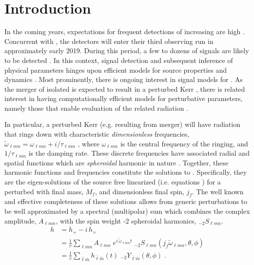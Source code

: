 \documentclass[twocolumn,aps,prd,floatfix,preprintnumbers,a4paper,nofootinbib,
superscriptaddress,10pt]{revtex4-1}
\newcommand{\cw}{\tilde{\omega}}
\def\jf{j_f}
\def\mf{M_f}
\def\lmn{_{\ell m n}}
\def\LM{_{\bar{\ell} \bar{m}}}
\begin{document}
\section{Introduction}
%
In the coming years, expectations for frequent \gw{} detections of increasing \snr{} are high \cite{TheLIGOScientific:2016pea,Abbott:2016nhf}.
%
Concurrent with \virgo{}, the \aligo{} detectors will enter their third observing run in approximately early 2019.
%
During this period, a few to dozens of \bbh{} signals are likely to be detected \cite{Abbott:2016nhf}.
%
In this context, signal detection and subsequent inference of physical parameters hinges upon efficient models for source properties and dynamics \cite{Abbott:2016wiq}.
%
Most prominently, there is ongoing interest in signal models for \bbh{} \imr{} \cite{Blackman:2017dfb, London:2017bcn, Hannam:2013oca}.
%
As the merger of isolated  is expected to result in a perturbed Kerr \bh{}, there is related interest in having computationally efficient models for perturbative parameters, namely those that enable evaluation of the related \rd{} radiation \cite{Berti:2005ys}.
%
\par In particular, a perturbed Kerr \bh{} (e.g. resulting from \bbh{} merger) will have \gw{} radiation that rings down with characteristic \textit{dimensionless} frequencies,
%
$%
	\cw\lmn = \omega\lmn + i/\tau\lmn
$%
, where $\omega\lmn$ is the central frequency of the ringing, and $1/\tau\lmn$ is the damping rate.
%
These discrete frequencies have associated radial and spatial functions which are \textit{spheroidal} harmonic in nature \cite{Leaver85,London:2014cma}.
%
Together, these harmonic functions and frequencies constitute the \qnm{} solutions to \ee{}.
%
Specifically, they are the eigen-solutions of the source free linearized \ee{} (i.e.  equations \cite{PhysRevLett.29.1114}) for a perturbed \bh{} with final mass, $\mf$, and dimensionless final spin, $\jf$.
%
The well known and effective completeness of these solutions allows \grad{} from generic perturbations to be well approximated by a spectral (multipolar) sum which combines the complex \qnm{} amplitude, $A\lmn$, with the spin weight -2 spheroidal harmonics, $_{-2}S\lmn$.
%
\begin{align}
	\label{hrd}
	h &= h_{+} - i \, h_{\times}
	  \\ \nonumber
	  &= \frac{1}{r} \sum\lmn A\lmn \; e^{i\,\cw\lmn t} \; _{-2}S\lmn( \jf \cw\lmn,\theta,\phi)
		\\ \nonumber
		&= \frac{1}{r} \sum\LM h\LM(t) \; _{-2}Y\LM(\theta,\phi) \;  .
\end{align}
\end{document}
